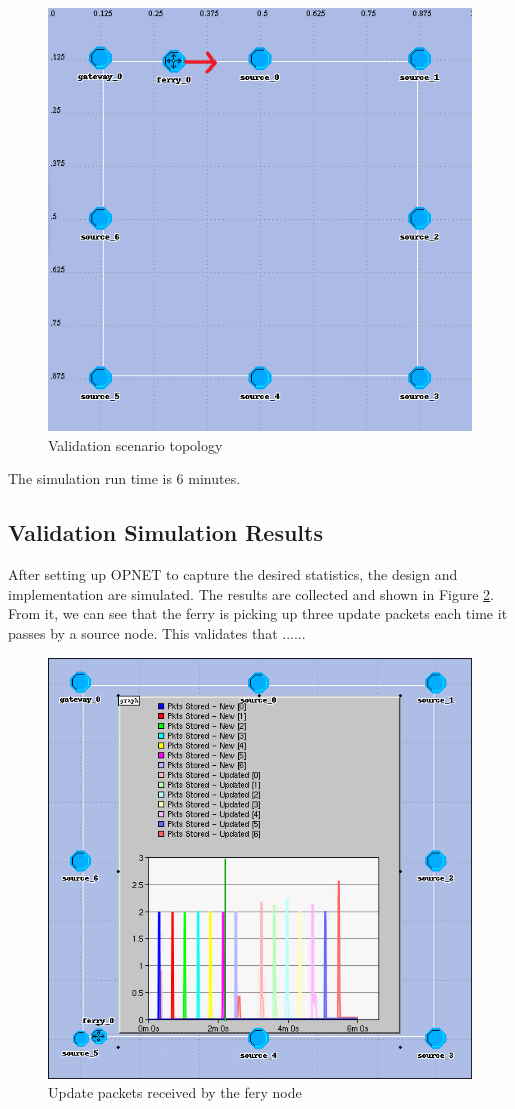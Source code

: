 \begin{figure}[h]
    \centering
    \includegraphics[width=.7\textwidth]{images/scenario1-top1r}
    \caption{Validation scenario topology}
    \label{fig:scenario1}
\end{figure}

The simulation run time is 6 minutes.  

\subsection{Validation Simulation Results}
\label{sec:results-validate}


After setting up OPNET to capture the desired statistics, the design and implementation are simulated.  The results are collected and shown in Figure \ref{fig:result1-a}.  From it, we can see that the ferry is picking up three update packets each time it passes by a source node.  This validates that ......

\begin{figure}[h]
    \centering
    \includegraphics[width=.5\textwidth]{images/scenario1-result-received}
    \caption{Update packets received by the fery node}
    \label{fig:result1-a}
\end{figure}

